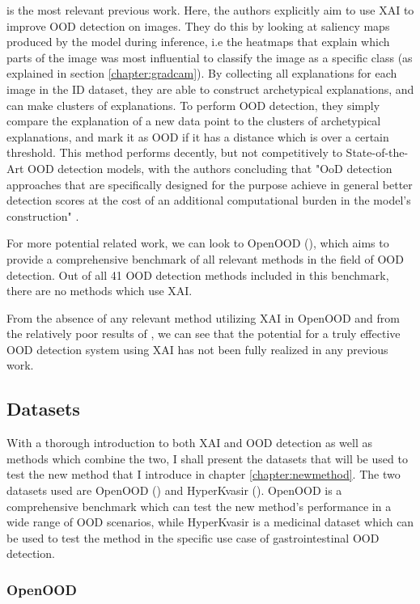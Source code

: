 \documentclass[UKenglish]{uiomasterthesis} %
\theoremstyle{definition}
\begin{document}
\cite{martinez} is the most relevant previous work. Here, the authors explicitly aim to use XAI to improve OOD detection on images. They do this by looking at saliency maps produced by the model during inference, i.e the heatmaps that explain which parts of the image was most influential to classify the image as a specific class (as explained in section \ref{chapter:gradcam}). By collecting all explanations for each image in the ID dataset, they are able to construct archetypical explanations, and can make clusters of explanations. To perform OOD detection, they simply compare the explanation of a new data point to the clusters of archetypical explanations, and mark it as OOD if it has a distance which is over a certain threshold. This method performs decently, but not competitively to State-of-the-Art OOD detection models, with the authors concluding that "OoD detection approaches that are specifically designed for the purpose achieve in general better detection scores at the cost of an additional computational burden in the model’s construction" \cite{martinez}.

For more potential related work, we can look to OpenOOD (\cite{openood}), which aims to provide a comprehensive benchmark of all relevant methods in the field of OOD detection. Out of all 41 OOD detection methods included in this benchmark, there are no methods which use XAI.

From the absence of any relevant method utilizing XAI in OpenOOD and from the relatively poor results of \cite{martinez}, we can see that the potential for a truly effective OOD detection system using XAI has not been fully realized in any previous work.

\subsection{Datasets}

With a thorough introduction to both XAI and OOD detection as well as methods which combine the two, I shall present the datasets that will be used to test the new method that I introduce in chapter \ref{chapter:newmethod}. The two datasets used are OpenOOD (\cite{openood}) and HyperKvasir (\cite{hyperkvasir}). OpenOOD is a comprehensive benchmark which can test the new method's performance in a wide range of OOD scenarios, while HyperKvasir is a medicinal dataset which can be used to test the method in the specific use case of gastrointestinal OOD detection.

\subsubsection{OpenOOD} \label{chapter:openood}
\end{document}
